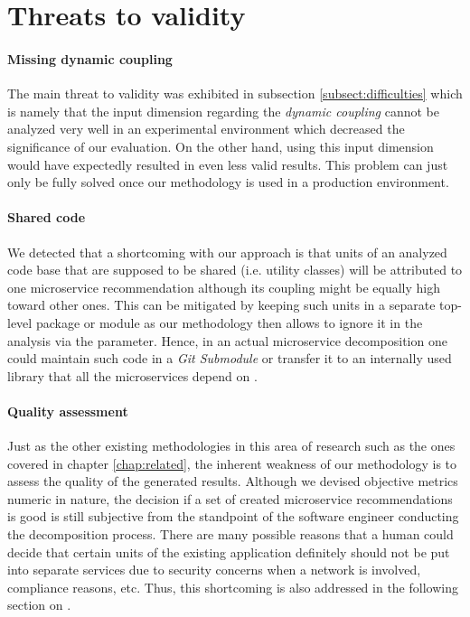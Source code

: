 \documentclass[12pt,a4paper]{report}
\begin{document}
\section{Threats to validity} \label{sect:threats-to-validity}

\paragraph{Missing dynamic coupling}
The main threat to validity was exhibited in subsection \ref{subsect:difficulties}
which is namely that the input dimension regarding the \textit{dynamic coupling}
cannot be analyzed very well in an experimental environment which decreased
the significance of our evaluation. On the other hand, using this input dimension
would have expectedly resulted in even less valid results. This problem can just
only be fully solved once our methodology is used in a production environment.

\paragraph{Shared code}
We detected that a shortcoming with our approach is that units
of an analyzed code base that are supposed to be shared (i.e. utility classes)
will be attributed to one microservice recommendation although its coupling
might be equally high toward other ones. This can be mitigated by keeping
such units in a separate top-level package or module as our methodology then
allows to ignore it in the analysis via the  parameter.
Hence, in an actual microservice decomposition one could maintain such code in a
\textit{Git Submodule} or transfer it to an internally used library that all the
microservices depend on \cite{git-submodules}.

\paragraph{Quality assessment}
Just as the other existing methodologies in this area of research
such as the ones covered in chapter \ref{chap:related}, the inherent weakness
of our methodology is to assess the quality of the generated results.
Although we devised objective metrics numeric in nature, the decision if a set
of created microservice recommendations is good is still subjective from the
standpoint of the software engineer conducting the decomposition process.
There are many possible reasons that a human could decide that certain units
of the existing application definitely should not be put into separate services
due to security concerns when a network is involved, compliance reasons, etc.
Thus, this shortcoming is also addressed in the following section on
\textit{}.
\end{document}
